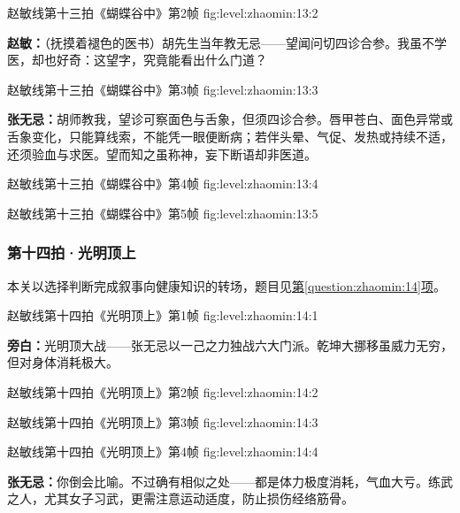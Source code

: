   {赵敏线第十三拍《蝴蝶谷中》第2帧}
  {fig:level:zhaomin:13:2}
  {\scriptsize}
  {\textbf{赵敏：}（抚摸着褪色的医书）胡先生当年教无忌——望闻问切四诊合参。我虽不学医，却也好奇：这望字，究竟能看出什么门道？\par}

  {赵敏线第十三拍《蝴蝶谷中》第3帧}
  {fig:level:zhaomin:13:3}
  {\scriptsize}
  {\textbf{张无忌：}胡师教我，望诊可察面色与舌象，但须四诊合参。唇甲苍白、面色异常或舌象变化，只能算线索，不能凭一眼便断病；若伴头晕、气促、发热或持续不适，还须验血与求医。望而知之虽称神，妄下断语却非医道。\par}

\clearpage

  {赵敏线第十三拍《蝴蝶谷中》第4帧}
  {fig:level:zhaomin:13:4}
  {\scriptsize}
  {\mbox{}}

  {赵敏线第十三拍《蝴蝶谷中》第5帧}
  {fig:level:zhaomin:13:5}
  {\scriptsize}
  {\mbox{}}

\subsubsection{第十四拍·光明顶上}\label{plot:zhaomin:14}
本关以选择判断完成叙事向健康知识的转场，题目见\hyperref[question:zhaomin:14]{第\ref*{question:zhaomin:14}项}。

  {赵敏线第十四拍《光明顶上》第1帧}
  {fig:level:zhaomin:14:1}
  {\scriptsize}
  {\textbf{旁白：}光明顶大战——张无忌以一己之力独战六大门派。乾坤大挪移虽威力无穷，但对身体消耗极大。\par}

\clearpage

  {赵敏线第十四拍《光明顶上》第2帧}
  {fig:level:zhaomin:14:2}
  {\scriptsize}
  {\mbox{}}

  {赵敏线第十四拍《光明顶上》第3帧}
  {fig:level:zhaomin:14:3}
  {\scriptsize}
  {\mbox{}}

  {赵敏线第十四拍《光明顶上》第4帧}
  {fig:level:zhaomin:14:4}
  {\scriptsize}
  {\textbf{张无忌：}你倒会比喻。不过确有相似之处——都是体力极度消耗，气血大亏。练武之人，尤其女子习武，更需注意运动适度，防止损伤经络筋骨。\par}

